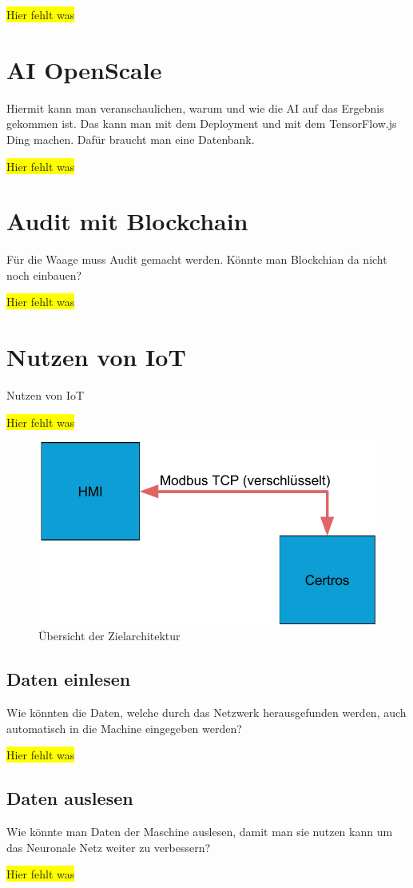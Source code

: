 \colorbox{yellow}{Hier fehlt was}

\section{AI OpenScale}
Hiermit kann man veranschaulichen, warum und wie die AI auf das Ergebnis gekommen ist. Das kann man mit dem Deployment
und mit dem TensorFlow.js Ding machen. Dafür braucht man eine Datenbank.

\colorbox{yellow}{Hier fehlt was}

\section{Audit mit Blockchain}
Für die Waage muss Audit gemacht werden. Könnte man Blockchian da nicht noch einbauen?

\colorbox{yellow}{Hier fehlt was}

\section{Nutzen von IoT}
Nutzen von IoT

\colorbox{yellow}{Hier fehlt was}

\begin{figure}[h]
    \centering
    \includegraphics[scale=0.5]{images/kapitel_6/iot_waage.pdf}
    \caption{Übersicht der Zielarchitektur}
    \label{fig:ausblick_iot}
\end{figure}

\subsection{Daten einlesen}
Wie könnten die Daten, welche durch das Netzwerk herausgefunden werden, auch automatisch in die Machine eingegeben werden?

\colorbox{yellow}{Hier fehlt was}

\subsection{Daten auslesen}
Wie könnte man Daten der Maschine auslesen, damit man sie nutzen kann um das Neuronale Netz weiter zu verbessern?

\colorbox{yellow}{Hier fehlt was}